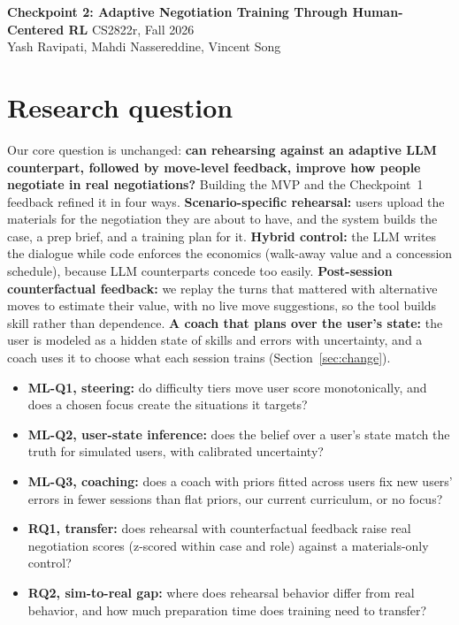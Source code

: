 \documentclass[10pt]{article}
\begin{document}
\noindent\textbf{Checkpoint 2: Adaptive Negotiation Training Through Human-Centered RL}
\hfill CS2822r, Fall 2026\\
{\small Yash Ravipati, Mahdi Nassereddine, Vincent Song}

\section{Research question}

Our core question is unchanged: \textbf{can rehearsing against an adaptive LLM
counterpart, followed by move-level feedback, improve how people negotiate in real
negotiations?} Building the MVP and the Checkpoint~1 feedback refined it in four ways.
\textbf{Scenario-specific rehearsal:} users upload the materials for the negotiation they
are about to have, and the system builds the case, a prep brief, and a training plan for
it. \textbf{Hybrid control:} the LLM writes the dialogue while code enforces the economics
(walk-away value and a concession schedule), because LLM counterparts concede too easily.
\textbf{Post-session counterfactual feedback:} we replay the turns that mattered with
alternative moves to estimate their value, with no live move suggestions, so the tool
builds skill rather than dependence. \textbf{A coach that plans over the user's state:}
the user is modeled as a hidden state of skills and errors with uncertainty, and a coach
uses it to choose what each session trains (Section~\ref{sec:change}).

\begin{itemize}
  \item \textbf{ML-Q1, steering:} do difficulty tiers move user score monotonically, and
    does a chosen focus create the situations it targets?
  \item \textbf{ML-Q2, user-state inference:} does the belief over a user's state match
    the truth for simulated users, with calibrated uncertainty?
  \item \textbf{ML-Q3, coaching:} does a coach with priors fitted across users fix new
    users' errors in fewer sessions than flat priors, our current curriculum, or no focus?
  \item \textbf{RQ1, transfer:} does rehearsal with counterfactual feedback raise real
    negotiation scores (z-scored within case and role) against a materials-only control?
  \item \textbf{RQ2, sim-to-real gap:} where does rehearsal behavior differ from real
    behavior, and how much preparation time does training need to transfer?
\end{itemize}
\end{document}
